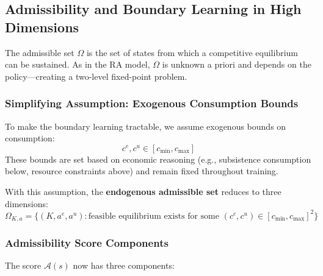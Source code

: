 \subsection{Admissibility and Boundary Learning in High Dimensions}

The admissible set $\Omega$ is the set of states from which a competitive equilibrium can be sustained. As in the RA model, $\Omega$ is unknown a priori and depends on the policy—creating a two-level fixed-point problem.

\subsubsection{Simplifying Assumption: Exogenous Consumption Bounds}

To make the boundary learning tractable, we assume exogenous bounds on consumption:
\begin{equation}
    c^e, c^u \in [c_{\min}, c_{\max}]
\end{equation}
These bounds are set based on economic reasoning (e.g., subsistence consumption below, resource constraints above) and remain fixed throughout training.

With this assumption, the \textbf{endogenous admissible set} reduces to three dimensions:
\begin{equation}
    \Omega_{K,a} = \{(K, a^e, a^u) : \text{feasible equilibrium exists for some } (c^e, c^u) \in [c_{\min}, c_{\max}]^2\}
\end{equation}

\subsubsection{Admissibility Score Components}

The score $\mathcal{A}(s)$ now has three components:

